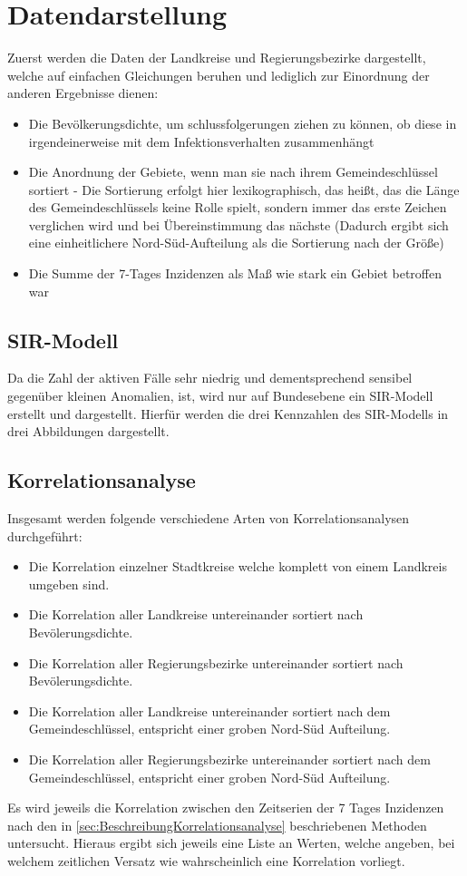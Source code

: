 \section{Datendarstellung}
Zuerst werden die Daten der Landkreise und Regierungsbezirke dargestellt, welche auf einfachen Gleichungen beruhen und lediglich zur Einordnung der anderen Ergebnisse dienen:
\begin{itemize}
    \item Die Bevölkerungsdichte, um schlussfolgerungen ziehen zu können, ob diese in irgendeinerweise mit dem Infektionsverhalten zusammenhängt
    \item Die Anordnung der Gebiete, wenn man sie nach ihrem Gemeindeschlüssel sortiert - Die Sortierung erfolgt hier lexikographisch, das heißt, das die Länge des Gemeindeschlüssels keine Rolle spielt, sondern immer das erste Zeichen verglichen wird und bei Übereinstimmung das nächste (Dadurch ergibt sich eine einheitlichere Nord-Süd-Aufteilung als die Sortierung nach der Größe)
    \item Die Summe der 7-Tages Inzidenzen als Maß wie stark ein Gebiet betroffen war
\end{itemize}
\subsection{SIR-Modell}
Da die Zahl der aktiven Fälle sehr niedrig und dementsprechend sensibel gegenüber kleinen Anomalien, ist, wird nur auf Bundesebene ein SIR-Modell erstellt und dargestellt. 
Hierfür werden die drei Kennzahlen des SIR-Modells in drei Abbildungen dargestellt.

\subsection{Korrelationsanalyse}
Insgesamt werden folgende verschiedene Arten von Korrelationsanalysen durchgeführt:
\begin{itemize}
    \item Die Korrelation einzelner Stadtkreise welche komplett von einem Landkreis umgeben sind.
    \item Die Korrelation aller Landkreise untereinander sortiert nach Bevölerungsdichte.
    \item Die Korrelation aller Regierungsbezirke untereinander sortiert nach Bevölerungsdichte.
    \item Die Korrelation aller Landkreise untereinander sortiert nach dem Gemeindeschlüssel, entspricht einer groben Nord-Süd Aufteilung.
    \item Die Korrelation aller Regierungsbezirke untereinander sortiert nach dem Gemeindeschlüssel, entspricht einer groben Nord-Süd Aufteilung.
\end{itemize}
Es wird jeweils die Korrelation zwischen den Zeitserien der 7 Tages Inzidenzen nach den in \autoref{sec:BeschreibungKorrelationsanalyse} beschriebenen Methoden untersucht. Hieraus ergibt sich jeweils eine Liste an Werten, welche angeben, bei welchem zeitlichen Versatz wie wahrscheinlich eine Korrelation vorliegt.

